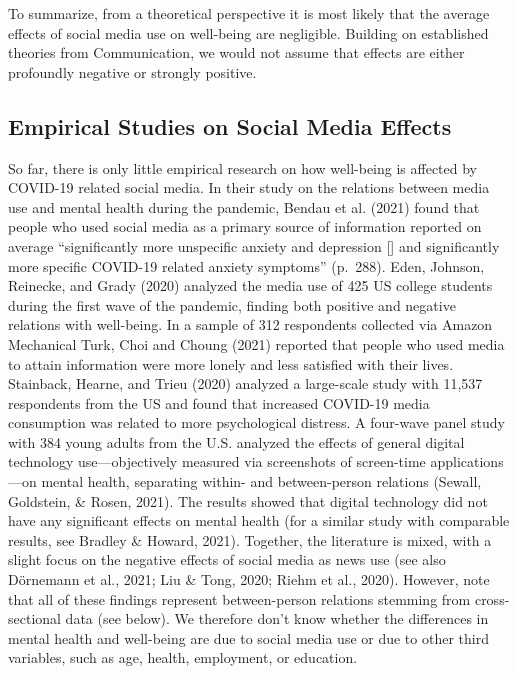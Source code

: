 \documentclass[
  man,mask]{apa6}
\begin{document}
To summarize, from a theoretical perspective it is most likely that the average effects of social media use on well-being are negligible.
Building on established theories from Communication, we would not assume that effects are either profoundly negative or strongly positive.

\hypertarget{empirical-studies-on-social-media-effects}{%
\subsection{Empirical Studies on Social Media Effects}\label{empirical-studies-on-social-media-effects}}

So far, there is only little empirical research on how well-being is affected by COVID-19 related social media.
In their study on the relations between media use and mental health during the pandemic, Bendau et al. (2021) found that people who used social media as a primary source of information reported on average ``significantly more unspecific anxiety and depression {[}{]} and significantly more specific COVID-19 related anxiety symptoms'' (p.~288).
Eden, Johnson, Reinecke, and Grady (2020) analyzed the media use of 425 US college students during the first wave of the pandemic, finding both positive and negative relations with well-being.
In a sample of 312 respondents collected via Amazon Mechanical Turk, Choi and Choung (2021) reported that people who used media to attain information were more lonely and less satisfied with their lives.
Stainback, Hearne, and Trieu (2020) analyzed a large-scale study with 11,537 respondents from the US and found that increased COVID-19 media consumption was related to more psychological distress.
A four-wave panel study with 384 young adults from the U.S. analyzed the effects of general digital technology use---objectively measured via screenshots of screen-time applications---on mental health, separating within- and between-person relations (Sewall, Goldstein, \& Rosen, 2021).
The results showed that digital technology did not have any significant effects on mental health (for a similar study with comparable results, see Bradley \& Howard, 2021).
Together, the literature is mixed, with a slight focus on the negative effects of social media as news use (see also Dörnemann et al., 2021; Liu \& Tong, 2020; Riehm et al., 2020).
However, note that all of these findings represent between-person relations stemming from cross-sectional data (see below).
We therefore don't know whether the differences in mental health and well-being are due to social media use or due to other third variables, such as age, health, employment, or education.
\end{document}
